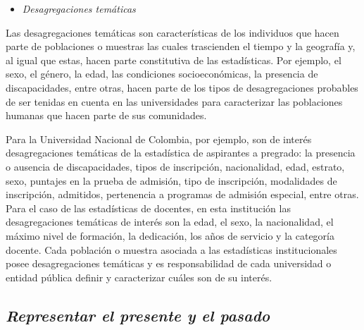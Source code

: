 \documentclass[
]{book}
\providecommand{\tightlist}{%
  \setlength{\itemsep}{0pt}\setlength{\parskip}{0pt}}
\begin{document}
\begin{itemize}
\tightlist
\item
  \emph{Desagregaciones temáticas}
\end{itemize}

Las desagregaciones temáticas son características de los individuos que hacen parte de poblaciones o muestras las cuales trascienden el tiempo y la geografía y, al igual que estas, hacen parte constitutiva de las estadísticas. Por ejemplo, el sexo, el género, la edad, las condiciones socioeconómicas, la presencia de discapacidades, entre otras, hacen parte de los tipos de desagregaciones probables de ser tenidas en cuenta en las universidades para caracterizar las poblaciones humanas que hacen parte de sus comunidades.

Para la Universidad Nacional de Colombia, por ejemplo, son de interés desagregaciones temáticas de la estadística de aspirantes a pregrado: la presencia o ausencia de discapacidades, tipos de inscripción, nacionalidad, edad, estrato, sexo, puntajes en la prueba de admisión, tipo de inscripción, modalidades de inscripción, admitidos, pertenencia a programas de admisión especial, entre otras. Para el caso de las estadísticas de docentes, en esta institución las desagregaciones temáticas de interés son la edad, el sexo, la nacionalidad, el máximo nivel de formación, la dedicación, los años de servicio y la categoría docente. Cada población o muestra asociada a las estadísticas institucionales posee desagregaciones temáticas y es responsabilidad de cada universidad o entidad pública definir y caracterizar cuáles son de su interés.

\hypertarget{representar-el-presente-y-el-pasado}{%
\subsection{\texorpdfstring{\textbf{\emph{Representar el presente y el pasado}}}{Representar el presente y el pasado}}\label{representar-el-presente-y-el-pasado}}
\end{document}

